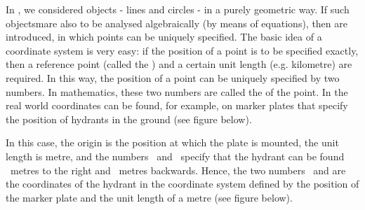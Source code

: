 
\Mtikzexternalize




\begin{MSectionStart}

\MModstartBox
\end{MSectionStart}


\begin{MIntro}

In , we considered objects - lines and circles - in a purely geometric way. If such objectsmare also to be analysed algebraically (by means of equations), then  
are introduced, in which points can be uniquely specified. The basic idea of a coordinate system is very easy: if the 
position of a point is to be specified exactly, then a reference point (called the ) and a certain 
unit length (e.g. kilometre) are required. In this way, the position of a point can be uniquely specified by two numbers.
In mathematics, these two numbers are called the  of the point. In the real world coordinates can be 
found, for example, on marker plates that specify the position of hydrants in the ground (see figure below).
\begin{center}
\end{center}

In this case, the origin is the position at which the plate is mounted, the unit length is metre, and the numbers
\ and \ specify that the hydrant can be found ~metres to the right and ~metres 
backwards. Hence, the two numbers \ and  are the coordinates of the hydrant in the coordinate
system defined by the position of the marker plate and the unit length of a metre (see figure below).


\end{MIntro}
